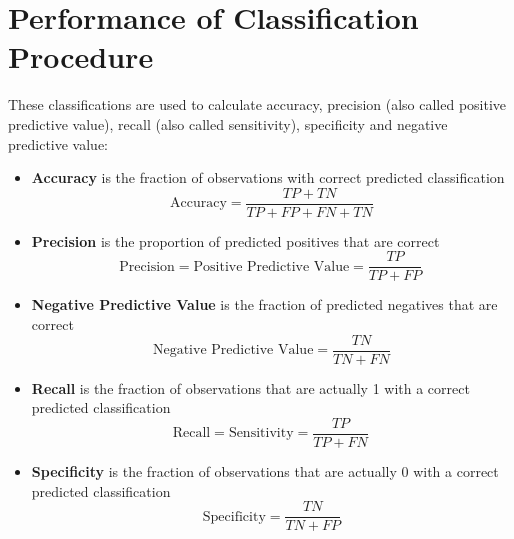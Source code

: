 


\section{Performance of Classification Procedure}
	
	These classifications are used to calculate accuracy, precision (also called positive predictive value), recall (also called sensitivity), specificity and negative predictive value:
	
	\begin{itemize}
		\item  \textbf{Accuracy} is the fraction of observations with correct predicted classification
		\[ \mbox{Accuracy}=\frac{TP+TN}{TP+FP+FN+TN}\]
		
		
		\item \textbf{Precision} is the proportion of predicted positives that are correct
		\[
		\mbox{Precision} = \mbox{Positive Predictive Value} =\frac{TP}{TP+FP} \, \]
		
		\item \textbf{Negative Predictive Value} is the  fraction of predicted negatives that are correct
		\[\mbox{Negative Predictive Value} = \frac{TN}{TN+FN}\]
		
		\item \textbf{Recall} is the fraction of observations that are actually 1 with a correct predicted classification
		\[ 
		\mbox{Recall} = \mbox{Sensitivity} = \frac{TP}{TP+FN} \,  \]
		
		\item \textbf{Specificity} is the fraction of observations that are actually 0 with a correct predicted classification
		\[ \mbox{Specificity} = \frac{TN}{TN+FP} \]
		
	\end{itemize}


